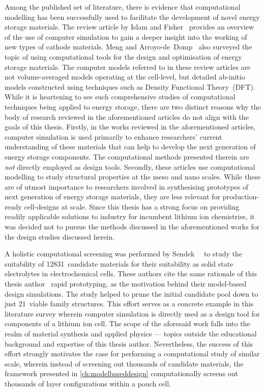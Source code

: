Among  the published  set of  literature, there  is evidence  that computational
modelling  has  been   successfully  used  to  facilitate   the  development  of
novel   energy   storage   materials.   The  review   article   by   Islam   and
Fisher~\cite{Islam2014} provides an  overview of the use  of computer simulation
to gain  a deeper insight  into the working of  new types of  cathode materials.
Meng  and  Arroyo-de~Domp~\cite{Meng2009}  also  surveyed  the  topic  of  using
computational tools for the design and optimisation of energy storage materials.
The computer models referred to in these review articles are not volume-averaged
models operating  at the cell-level,  but detailed ab-initio  models constructed
using techniques such as Density Functional Theory~(DFT). While it is heartening
to see such  comprehensive studies of computational techniques  being applied to
energy storage, there are two distinct reasons why the body of research reviewed
in  the aforementioned  articles do  not align  with the  goals of  this thesis.
Firstly,  in  the  works  reviewed  in  the  aforementioned  articles,  computer
simulation is  used primarily to  enhance researchers' current  understanding of
these materials that  can help to develop the next  generation of energy storage
components. The computational methods  presented therein are \emph{not} directly
employed as design  tools. Secondly, these articles  use computational modelling
to study  structural properties  at the  meso and nano  scales. While  these are
of  utmost importance  to  researchers involved  in  synthesising prototypes  of
next  generation  of  energy  storage  materials, they  are  less  relevant  for
production-ready cell-designs at scale. Since this  thesis has a strong focus on
providing readily  applicable solutions  to industry  for incumbent  lithium ion
chemistries,  it  was  decided  not  to pursue  the  methods  discussed  in  the
aforementioned works for the design studies discussed herein.

\addlines[0.5]
A      holistic      computational      screening     was      performed      by
Sendek~\etal~\cite{Sendek2017}  to  study  the  suitability  of  12831~candidate
materials for their  suitability as solid state  electrolytes in electrochemical
cells. These  authors cite the  same rationale  of this thesis  author \ie~rapid
prototyping, as the motivation behind  their model-based design simulations. The
study helped to  prune the initial candidate pool down  to just 21~viable family
structures. This effort  serves as a concrete example in  this literature survey
wherein computer simulation is directly used  as a design tool for components of
a lithium  ion cell. The  scope of  the aforesaid work  falls into the  realm of
material  synthesis  and applied  physics  ---  topics outside  the  educational
background and  expertise of  this thesis author.  Nevertheless, the  success of
this effort  strongly motivates  the case for  performing a  computational study
of  similar scale,  wherein  instead  of screening  out  thousands of  candidate
materials, the framework presented in \cref{ch:modelbaseddesign} computationally
screens out thousands of layer configurations within a pouch cell.

